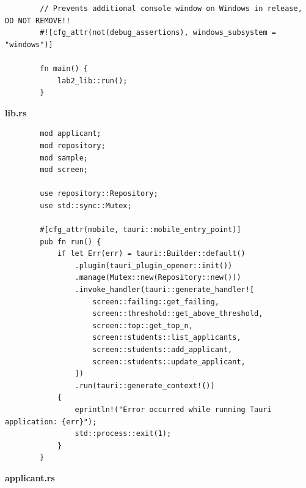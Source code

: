 \documentclass[14pt, a4paper]{extreport}
\begin{document}
	\begin{verbatim}
		// Prevents additional console window on Windows in release, DO NOT REMOVE!!
		#![cfg_attr(not(debug_assertions), windows_subsystem = "windows")]

		fn main() {
			lab2_lib::run();
		}
	\end{verbatim}

	\textbf{lib.rs}

	\begin{verbatim}
		mod applicant;
		mod repository;
		mod sample;
		mod screen;

		use repository::Repository;
		use std::sync::Mutex;

		#[cfg_attr(mobile, tauri::mobile_entry_point)]
		pub fn run() {
			if let Err(err) = tauri::Builder::default()
				.plugin(tauri_plugin_opener::init())
				.manage(Mutex::new(Repository::new()))
				.invoke_handler(tauri::generate_handler![
					screen::failing::get_failing,
					screen::threshold::get_above_threshold,
					screen::top::get_top_n,
					screen::students::list_applicants,
					screen::students::add_applicant,
					screen::students::update_applicant,
				])
				.run(tauri::generate_context!())
			{
				eprintln!("Error occurred while running Tauri application: {err}");
				std::process::exit(1);
			}
		}
	\end{verbatim}

	\textbf{applicant.rs}
\end{document}
